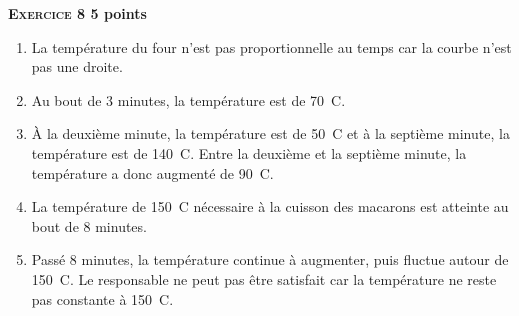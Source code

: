 \textbf{\textsc{Exercice 8} \hfill 5 points}

\medskip

\begin{enumerate}
\item La température du four n'est pas proportionnelle au temps car la courbe n'est pas
une droite.
\item Au bout de 3 minutes, la température est de 70~\degres C.
\item À la deuxième minute, la température est de 50~\degres C et à la septième minute, la
température est de 140~\degres C. Entre la deuxième et la septième minute, la température a
donc augmenté de 90~\degres C.
\item La température de 150~\degres C nécessaire à la cuisson des macarons est atteinte au bout
de 8 minutes.
\item Passé 8 minutes, la température continue à augmenter, puis fluctue autour de 150~\degres C. Le responsable ne peut pas être satisfait car la température ne reste pas constante
à 150~\degres C.
\end{enumerate}

\vspace{0,5cm}

